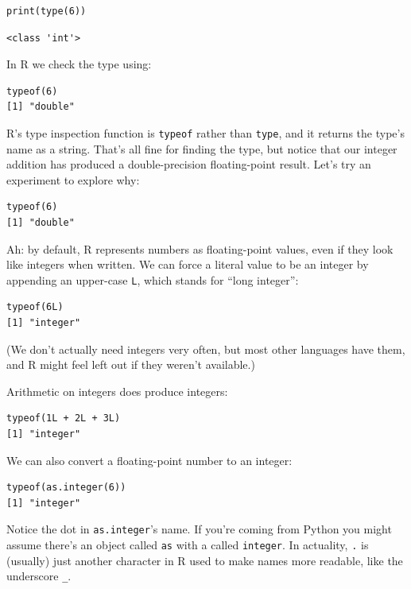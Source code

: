 \begin{lstlisting}
print(type(6))
\end{lstlisting}

\begin{lstlisting}
<class 'int'>
\end{lstlisting}

In R we check the type using:

\begin{lstlisting}
typeof(6)
[1] "double"
\end{lstlisting}

R's type inspection function is \texttt{typeof} rather than \texttt{type},
and it returns the type's name as a string.
That's all fine for finding the type,
but notice that our integer addition has produced a double-precision floating-point result.
Let's try an experiment to explore why:

\begin{lstlisting}
typeof(6)
[1] "double"
\end{lstlisting}

Ah: by default,
R represents numbers as floating-point values,
even if they look like integers when written.
We can force a literal value to be an integer by appending an upper-case \texttt{L},
which stands for ``long integer'':

\begin{lstlisting}
typeof(6L)
[1] "integer"
\end{lstlisting}

(We don't actually need integers very often,
but most other languages have them,
and R might feel left out if they weren't available.)


Arithmetic on integers does produce integers:

\begin{lstlisting}
typeof(1L + 2L + 3L)
[1] "integer"
\end{lstlisting}

We can also convert a floating-point number to an integer:

\begin{lstlisting}
typeof(as.integer(6))
[1] "integer"
\end{lstlisting}

Notice the dot in \texttt{as.integer}'s name.
If you're coming from Python you might assume there's an object called \texttt{as}
with a  called \texttt{integer}.
In actuality,
\texttt{.} is (usually) just another character in R used to make names more readable, 
like the underscore \texttt{\_}.

